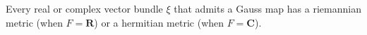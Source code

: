 Every real or complex vector bundle $\xi$ that admits a Gauss map has a riemannian metric (when $F = \mathbf{R}$) or a hermitian metric (when $F = \mathbf{C}$).
